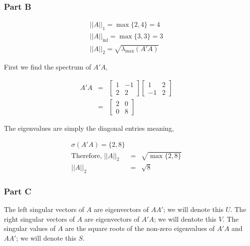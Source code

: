 

\subsubsection{Part B}
\begin{eqnarray}
  || A ||_1 = \max \{2,4\} = \boxed{4} \\
  || A ||_{\inf} = \max \{3,3\} = \boxed{3} \\
  || A ||_2 = \sqrt{ \lambda_{\max} (A'A)}
\end{eqnarray}

First we find the spectrum of \(A'A\),

\begin{eqnarray}
  A'A &=&
  \begin{bmatrix}
    1 & -1 \\
    2 & 2
  \end{bmatrix}
  \begin{bmatrix}
    1 & 2 \\
    -1 & 2
  \end{bmatrix}
  \\
  &=&
  \begin{bmatrix}
    2 & 0 \\
    0 & 8
  \end{bmatrix}
\end{eqnarray}

The eigenvalues are simply the diagonal entries meaning,

\begin{eqnarray}
  \sigma(A'A) = \{2,8\} \\
  \text{Therefore, }
  ||A||_2 &=& \sqrt{\max \{2,8\}} \\
  ||A||_2 &=& \boxed{\sqrt{8}}
\end{eqnarray}



\subsubsection{Part C}
The left singular vectors of \(A\) are eigenvectors of \(AA'\); we will denote this \(U\).
The right singular vectors of \(A\) are eigenvectors of \(A'A\); we will dentote this \(V\).
The singular values of \(A\) are the square roots of the non-zero eigenvalues of \(A'A\) and \(AA'\); we will denote this \(S\).

